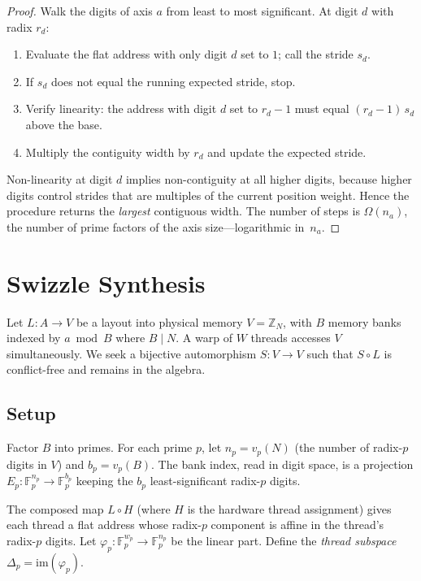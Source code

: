 \documentclass[11pt]{article}
\theoremstyle{definition}
\theoremstyle{remark}
\newcommand{\Z}{\mathbb{Z}}
\newcommand{\F}{\mathbb{F}}
\newcommand{\im}{\mathrm{im}}
\begin{document}
\begin{proof}
Walk the digits of axis $a$ from least to most significant.
At digit $d$ with radix $r_d$:
\begin{enumerate}[nosep]
\item Evaluate the flat address with only digit $d$ set to $1$; call the stride $s_d$.
\item If $s_d$ does not equal the running expected stride, stop.
\item Verify linearity: the address with digit $d$ set to $r_d - 1$ must equal $(r_d - 1)\,s_d$ above the base.
\item Multiply the contiguity width by $r_d$ and update the expected stride.
\end{enumerate}
Non-linearity at digit $d$ implies non-contiguity at all higher digits, because higher digits control strides that are multiples of the current position weight.
Hence the procedure returns the \emph{largest} contiguous width.
The number of steps is $\Omega(n_a)$, the number of prime factors of the axis size---logarithmic in~$n_a$.
\end{proof}

\section{Swizzle Synthesis}

Let $L: A \to V$ be a layout into physical memory $V = \Z_N$, with $B$ memory banks indexed by $a \bmod B$ where $B \mid N$.
A warp of $W$ threads accesses $V$ simultaneously.
We seek a bijective automorphism $S: V \to V$ such that $S \circ L$ is conflict-free and remains in the algebra.

\subsection*{Setup}

Factor $B$ into primes.
For each prime $p$, let $n_p = v_p(N)$ (the number of radix-$p$ digits in $V$) and $b_p = v_p(B)$.
The bank index, read in digit space, is a projection $E_p: \F_p^{n_p} \to \F_p^{b_p}$ keeping the $b_p$ least-significant radix-$p$ digits.

The composed map $L \circ H$ (where $H$ is the hardware thread assignment) gives each thread a flat address whose radix-$p$ component is affine in the thread's radix-$p$ digits.
Let $\varphi_p: \F_p^{w_p} \to \F_p^{n_p}$ be the linear part.
Define the \emph{thread subspace} $\Delta_p = \im(\varphi_p)$.
\end{document}
